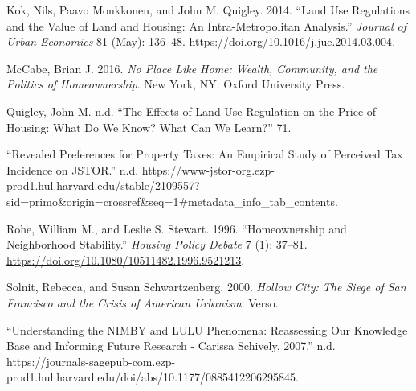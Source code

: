 \documentclass[]{article}
\begin{document}
\leavevmode\hypertarget{ref-kokLandUseRegulations2014}{}%
Kok, Nils, Paavo Monkkonen, and John M. Quigley. 2014. ``Land Use Regulations and the Value of Land and Housing: An Intra-Metropolitan Analysis.'' \emph{Journal of Urban Economics} 81 (May): 136--48. \url{https://doi.org/10.1016/j.jue.2014.03.004}.

\leavevmode\hypertarget{ref-mccabeNoPlaceHome2016}{}%
McCabe, Brian J. 2016. \emph{No Place Like Home: Wealth, Community, and the Politics of Homeownership}. New York, NY: Oxford University Press.

\leavevmode\hypertarget{ref-quigleyEffectsLandUse}{}%
Quigley, John M. n.d. ``The Effects of Land Use Regulation on the Price of Housing: What Do We Know? What Can We Learn?'' 71.

\leavevmode\hypertarget{ref-RevealedPreferencesProperty}{}%
``Revealed Preferences for Property Taxes: An Empirical Study of Perceived Tax Incidence on JSTOR.'' n.d. https://www-jstor-org.ezp-prod1.hul.harvard.edu/stable/2109557?sid=primo\&origin=crossref\&seq=1\#metadata\_info\_tab\_contents.

\leavevmode\hypertarget{ref-roheHomeownershipNeighborhoodStability1996}{}%
Rohe, William M., and Leslie S. Stewart. 1996. ``Homeownership and Neighborhood Stability.'' \emph{Housing Policy Debate} 7 (1): 37--81. \url{https://doi.org/10.1080/10511482.1996.9521213}.

\leavevmode\hypertarget{ref-solnitHollowCitySiege2000}{}%
Solnit, Rebecca, and Susan Schwartzenberg. 2000. \emph{Hollow City: The Siege of San Francisco and the Crisis of American Urbanism}. Verso.

\leavevmode\hypertarget{ref-UnderstandingNIMBYLULU}{}%
``Understanding the NIMBY and LULU Phenomena: Reassessing Our Knowledge Base and Informing Future Research - Carissa Schively, 2007.'' n.d. https://journals-sagepub-com.ezp-prod1.hul.harvard.edu/doi/abs/10.1177/0885412206295845.
\end{document}
